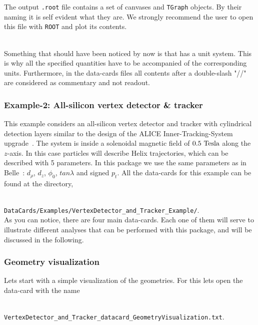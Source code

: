 \noindent
The output {\tt .root} file contains a set of canvases and {\tt TGraph} objects. By their naming it is self evident what they are. We strongly recommend 
the user to open this file with {\tt ROOT} and plot its contents.

~\\
\noindent
Something that should have been noticed by now is that {\guari} has a unit system. This is why all the specified quantities have to 
be accompanied of the corresponding units. Furthermore, in the data-cards files all contents after a double-slash "//" are considered as 
commentary and not readout.

\subsubsection{Example-2: All-silicon vertex detector \& tracker}
\label{subsubsec:Example2}

This example considers an all-silicon vertex detector and tracker with cylindrical detection layers similar to the design of the ALICE 
Inner-Tracking-System upgrade~\cite{bib:ALICE_ITS_Upgrade}. The system is inside a solenoidal magnetic field of $0.5~{\rm Tesla}$ along the 
$z$-axis. In this case particles will describe Helix trajectories, which can be described with 5 parameters. In this package we use 
the same parameters as in Belle~\cite{bib:BelleHelixParam}: $d_{\rho}$, $d_z$, $\phi_0$, $tan\lambda$ and signed $p_t$. All the data-cards 
for this example can be found at the directory, 

~\\
{\tt DataCards/Examples/VertexDetector\_and\_Tracker\_Example/}.
~\\

\noindent
As you can notice, there are four main data-cards. Each one of them will serve to illustrate different analyses that can be performed with this 
package, and will be discussed in the following. 

\subsubsection*{Geometry visualization}

Lets start with a simple visualization of the geometries. For this lets open the data-card with the name

~\\
{\small{\tt VertexDetector\_and\_Tracker\_datacard\_GeometryVisualization.txt}}.
~\\

